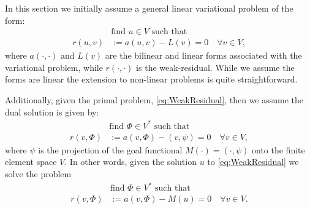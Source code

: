 In this section we initially assume a general linear variational problem of the
form:
\begin{equation}
    \begin{split}
        &\text{find } u \in V \text{ such that} \\
        r(u, v) &:= a(u, v) - L(v) = 0 \quad \forall v \in V,
    \end{split}
    \label{eq:WeakResidual}
\end{equation}
where $a(\cdot, \cdot)$ and $L(v)$ are the bilinear and linear forms associated
with the variational problem, while $r(\cdot, \cdot)$ is the weak-residual.
While we assume the forms are linear the extension to non-linear problems is
quite straightforward.

Additionally, given the primal problem, \eqref{eq:WeakResidual}, then we assume
the dual solution is given by:
\begin{equation*}
    \begin{split}
        &\text{find } \Phi \in V^* \text{ such that} \\
        r(v, \Phi) &:= a(v, \Phi) - (v, \psi) = 0 \quad \forall v \in V,
    \end{split}
\end{equation*}
where $\psi$ is the projection of the goal functional $M(\cdot) = (\cdot, \psi)$
onto the finite element space $V$. In other words, given the solution $u$ to
\eqref{eq:WeakResidual} we solve the problem
\begin{equation}
    \begin{split}
        &\text{find } \Phi \in V^* \text{ such that} \\
        r(v, \Phi) &:= a(v, \Phi) - M(u) = 0 \quad \forall v \in V.
    \end{split}
    \label{eq:Dual}
\end{equation}

